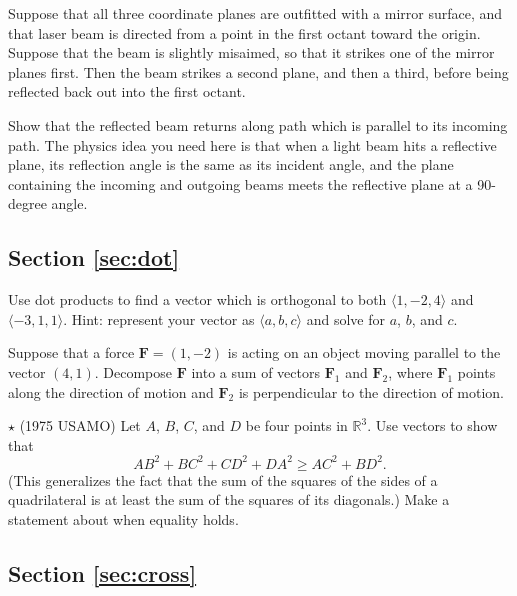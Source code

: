 \documentclass[svgnames]{watsonbook}
\begin{document}
\begin{exercise}{}{}
  Suppose that all three coordinate planes are outfitted with a mirror
  surface, and that laser beam is directed from a point in the first
  octant toward the origin. Suppose that the beam is slightly
  misaimed, so that it strikes one of the mirror planes first. Then
  the beam strikes a second plane, and then a third, before being
  reflected back out into the first octant.

  Show that the reflected beam returns along  path which is parallel
  to its incoming path. The physics idea you need here is that when  a
  light beam hits a reflective plane, its reflection angle is the same
  as its incident angle, and the plane containing the incoming and
  outgoing beams meets the reflective plane at a 90-degree angle. 
\end{exercise}

\subsection*{Section \ref{sec:dot}}

\begin{exercise}{}{}
  Use dot products to find a vector which is orthogonal to both
  $\langle 1, -2, 4 \rangle$ and $\langle -3, 1, 1 \rangle$. Hint:
  represent your vector as $\langle a, b, c \rangle$ and solve for
  $a$, $b$, and $c$. 
\end{exercise}

\begin{exercise}{}{}
Suppose that a force $\mathbf{F}=(1,-2)$ is acting on an object moving
parallel to the vector $(4,1)$. Decompose $\mathbf{F}$ into a sum of
vectors $\mathbf{F}_1$ and $\mathbf{F}_2$, where $\mathbf{F}_1$ points
along the direction of motion and $\mathbf{F}_2$ is perpendicular to
the direction of motion.
\end{exercise}

\begin{exercise}{$\star$ (1975 USAMO)}{}
  Let $A$, $B$, $C$, and $D$ be four points in $\mathbb{R}^3$. Use vectors to show that 
\[
AB^2 +BC^2 + CD^2 + DA^2 \geq AC^2 + BD^2. 
\]
(This generalizes the fact that the sum of the squares of the sides of
a quadrilateral is at least the sum of the squares of its diagonals.)
Make a statement about when equality holds.
\end{exercise}

\subsection*{Section \ref{sec:cross}}
\end{document}
